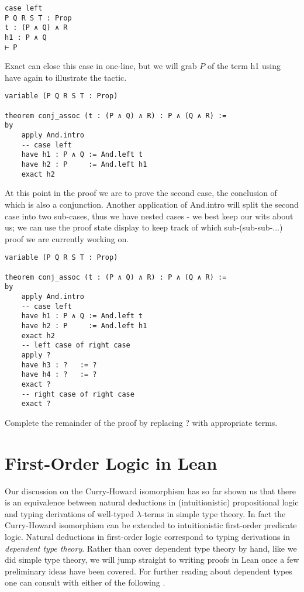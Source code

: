 \documentclass{book}
\begin{document}
\begin{eg}
\begin{center}
\begin{lstlisting}
case left
P Q R S T : Prop
t : (P ∧ Q) ∧ R
h1 : P ∧ Q
⊢ P
            \end{lstlisting}            
        \end{center}
        Exact can close this case in one-line, but we will grab $P$ of the term h1 using have again to illustrate the tactic.
        \begin{center}
            \begin{lstlisting}
variable (P Q R S T : Prop)

theorem conj_assoc (t : (P ∧ Q) ∧ R) : P ∧ (Q ∧ R) :=
by
    apply And.intro
    -- case left
    have h1 : P ∧ Q := And.left t
    have h2 : P     := And.left h1
    exact h2
            \end{lstlisting}            
        \end{center}

        At this point in the proof we are to prove the second case, the conclusion of which is also a conjunction. Another application of And.intro will split the second case into two sub-cases, thus we have nested cases - we best keep our wits about us; we can use the proof state display to keep track of which sub-(sub-sub-...) proof we are currently working on. 

        \begin{center}
            \begin{lstlisting}
variable (P Q R S T : Prop)

theorem conj_assoc (t : (P ∧ Q) ∧ R) : P ∧ (Q ∧ R) :=
by
    apply And.intro
    -- case left
    have h1 : P ∧ Q := And.left t
    have h2 : P     := And.left h1
    exact h2
    -- left case of right case
    apply ?
    have h3 : ?   := ?
    have h4 : ?   := ?
    exact ?
    -- right case of right case
    exact ?
            \end{lstlisting}            
        \end{center}
        Complete the remainder of the proof by replacing ? with appropriate terms.  
    \end{eg}

    \newpage
    \section{First-Order Logic in Lean}

    Our discussion on the Curry-Howard isomorphism has so far shown us that there is an equivalence between natural deductions in (intuitionistic) propositional logic and typing derivations of well-typed $\lambda$-terms in simple type theory. In fact the Curry-Howard isomorphism can be extended to intuitionistic first-order predicate logic. Natural deductions in first-order logic correspond to typing derivations in \emph{dependent type theory}. Rather than cover dependent type theory by hand, like we did simple type theory, we will jump straight to writing proofs in Lean once a few preliminary ideas have been covered. For further reading about dependent types one can consult with either of the following \cite{thompson} \cite{hottbook}.
\end{document}
